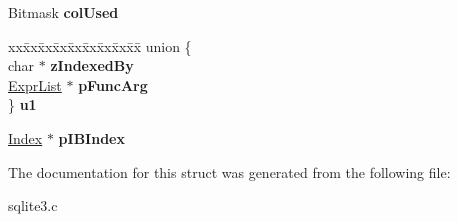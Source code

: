 \begin{DoxyCompactItemize}
\item 
Bitmask {\bfseries col\+Used}\hypertarget{structSrcList_1_1SrcList__item_a4fd7e7e26995048b58006d020e8c48d6}{}\label{structSrcList_1_1SrcList__item_a4fd7e7e26995048b58006d020e8c48d6}

\item 
\begin{tabbing}
xx\=xx\=xx\=xx\=xx\=xx\=xx\=xx\=xx\=\kill
union \{\\
\>char $\ast$ {\bfseries zIndexedBy}\\
\>\hyperlink{structExprList}{ExprList} $\ast$ {\bfseries pFuncArg}\\
\} {\bfseries u1}\hypertarget{structSrcList_1_1SrcList__item_a97bae7bc42769542d1ad49452a5016c9}{}\label{structSrcList_1_1SrcList__item_a97bae7bc42769542d1ad49452a5016c9}
\\

\end{tabbing}\item 
\hyperlink{structIndex}{Index} $\ast$ {\bfseries p\+I\+B\+Index}\hypertarget{structSrcList_1_1SrcList__item_a33f82c4d70c773856d55a5ebe9b1cc8c}{}\label{structSrcList_1_1SrcList__item_a33f82c4d70c773856d55a5ebe9b1cc8c}

\end{DoxyCompactItemize}


The documentation for this struct was generated from the following file\+:\begin{DoxyCompactItemize}
\item 
sqlite3.\+c\end{DoxyCompactItemize}
